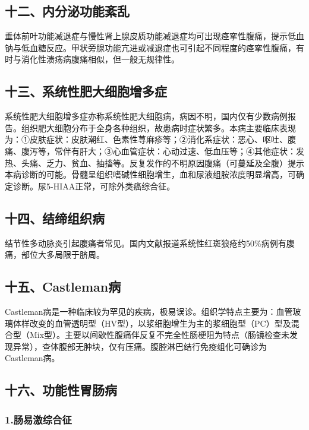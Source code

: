 \subsection{十二、内分泌功能紊乱}

垂体前叶功能减退症与慢性肾上腺皮质功能减退症均可出现痉挛性腹痛，提示低血钠与低血糖反应。甲状旁腺功能亢进或减退症也可引起不同程度的痉挛性腹痛，有时与消化性溃疡病腹痛相似，但一般无规律性。

\subsection{十三、系统性肥大细胞增多症}

系统性肥大细胞增多症亦称系统性肥大细胞病，病因不明，国内仅有少数病例报告。组织肥大细胞分布于全身各种组织，故患病时症状繁多。本病主要临床表现为：①皮肤症状：皮肤潮红、色素性荨麻疹等；②消化系症状：恶心、呕吐、腹痛、腹泻等，常伴有肝大；③心血管症状：心动过速、低血压等；④其他症状：发热、头痛、乏力、贫血、抽搐等。反复发作的不明原因腹痛（可蔓延及全腹）提示本病诊断的可能。骨髓呈组织嗜碱性细胞增生，血和尿液组胺浓度明显增高，可确定诊断。尿5-HIAA正常，可除外类癌综合征。

\subsection{十四、结缔组织病}

结节性多动脉炎引起腹痛者常见。国内文献报道系统性红斑狼疮约50\%病例有腹痛，部位大多局限于脐周。

\subsection{十五、Castleman病}

Castleman病是一种临床较为罕见的疾病，极易误诊。组织学特点主要为：血管玻璃体样改变的血管透明型（HV型），以浆细胞增生为主的浆细胞型（PC）型及混合型（Mix型）。主要以间歇性腹痛伴反复不完全性肠梗阻为特点（肠镜检查未发现异常），查体腹部无肿块，仅有压痛。腹腔淋巴结行免疫组化可确诊为Castleman病。

\subsection{十六、功能性胃肠病}

\subsubsection{1.肠易激综合征}

